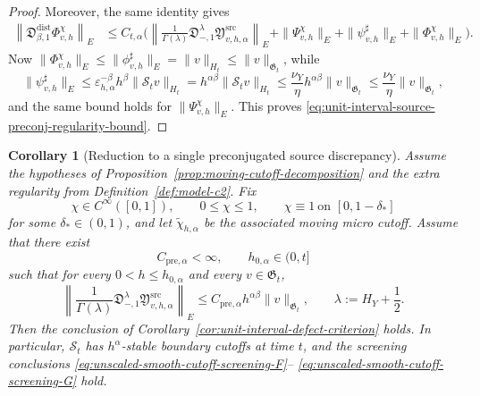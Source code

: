 \documentclass[11pt,a4paper]{amsart}
\theoremstyle{plain}
\newtheorem{corollary}[theorem]{Corollary}
\theoremstyle{definition}
\theoremstyle{remark}
\begin{document}
\begin{proof}
Moreover, the same identity gives
\begin{align*}
\left\|
\mathfrak D_{\beta,1}^{\mathrm{dist}}\Phi_{v,h}^{\chi}
\right\|_{E}
&\le
C_{t,\alpha}
\Biggl(
\left\|
\frac{1}{\Gamma(\lambda)}
\mathfrak D_{-,1}^{\lambda}
\mathfrak Y_{v,h,\alpha}^{\mathrm{src}}
\right\|_{E}
+
\|\Psi_{v,h}^{\chi}\|_{E}
+
\|\psi_{v,h}^{\sharp}\|_{E}
+
\|\Phi_{v,h}^{\chi}\|_{E}
\Biggr).
\end{align*}
Now \(\|\Phi_{v,h}^{\chi}\|_{E}\le \|\phi_{v,h}^{\sharp}\|_{E}=\|v\|_{H_t}\le\|v\|_{\mathfrak G_t}\),
while
\[
\|\psi_{v,h}^{\sharp}\|_{E}
\le
\varepsilon_{h,\alpha}^{-\beta}h^\beta\|\mathcal S_t v\|_{H_t}
=
h^{\alpha\beta}\|\mathcal S_t v\|_{H_t}
\le
\frac{\nu_Y}{\eta}h^{\alpha\beta}\|v\|_{\mathfrak G_t}
\le
\frac{\nu_Y}{\eta}\|v\|_{\mathfrak G_t},
\]
and the same bound holds for \(\|\Psi_{v,h}^{\chi}\|_{E}\). This proves
\eqref{eq:unit-interval-source-preconj-regularity-bound}.
\end{proof}

\begin{corollary}[Reduction to a single preconjugated source discrepancy]
\label{cor:unit-interval-source-preconj}
Assume the hypotheses of Proposition~\ref{prop:moving-cutoff-decomposition} and the extra regularity
from Definition~\ref{def:model-c2}. Fix
\[
\chi\in C^\infty([0,1]),
\qquad
0\le \chi\le1,
\qquad
\chi\equiv1\ \text{on }[0,1-\delta_*]
\]
for some \(\delta_*\in(0,1)\), and let \(\widetilde\chi_{h,\alpha}\) be the associated moving micro
cutoff. Assume that there exist
\[
C_{\mathrm{pre},\alpha}<\infty,
\qquad
h_{0,\alpha}\in(0,t]
\]
such that for every \(0<h\le h_{0,\alpha}\) and every \(v\in\mathfrak G_t\),
\begin{equation}\label{eq:unit-interval-source-preconj-bound}
\left\|
\frac{1}{\Gamma(\lambda)}
\mathfrak D_{-,1}^{\lambda}
\mathfrak Y_{v,h,\alpha}^{\mathrm{src}}
\right\|_{E}
\le
C_{\mathrm{pre},\alpha}h^{\alpha\beta}\|v\|_{\mathfrak G_t},
\qquad
\lambda:=H_Y+\frac12.
\end{equation}
Then the conclusion of Corollary~\ref{cor:unit-interval-defect-criterion} holds. In particular,
\(\mathcal S_t\) has \(h^\alpha\)-stable boundary cutoffs at time \(t\), and the screening
conclusions \eqref{eq:unscaled-smooth-cutoff-screening-F}--
\eqref{eq:unscaled-smooth-cutoff-screening-G} hold.
\end{corollary}
\end{document}
